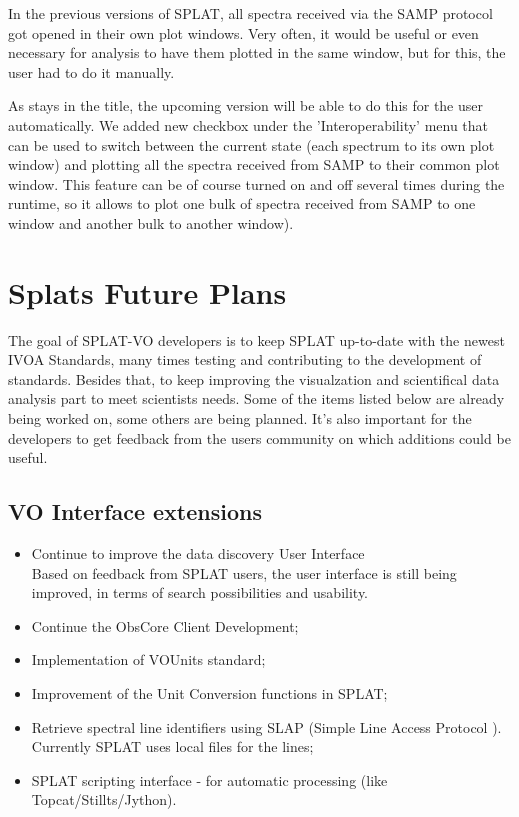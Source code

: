 \documentclass[final,authoryear,5p,times,twocolumn]{elsarticle}
\begin{document}
In the previous versions of SPLAT, all spectra received via the SAMP
protocol got opened in their own plot windows. Very often, it would be
useful or even necessary for analysis to have them plotted in the same
window, but for this, the user had to do it manually.

As stays in the title, the upcoming version will be able to do this
for the user automatically. We added new checkbox under the
'Interoperability' menu that can be used to switch between the current
state (each spectrum to its own plot window) and plotting all the
spectra received from SAMP to their common plot window. This feature
can be of course turned on and off several times during the runtime,
so it allows to plot one bulk of spectra received from SAMP to one
window and another bulk to another window).

\section{Splats Future Plans}

The goal of SPLAT-VO developers is to keep SPLAT up-to-date with the
newest IVOA Standards, many times testing and contributing to the
development of standards. Besides that, to keep improving the
visualzation and scientifical data analysis part to meet scientists
needs.  Some of the items listed below are already being worked on,
some others are being planned. It's also important for the developers
to get feedback from the users community on which additions could be
useful.

\subsection{VO Interface extensions}
\begin{itemize}
\item Continue to improve the data discovery User Interface\\
Based on feedback from SPLAT users, the user interface is still being improved, in terms of search possibilities and usability.
\item Continue the ObsCore Client Development;
\item Implementation of  VOUnits \cite{vounits} standard;
\item	Improvement of the Unit Conversion functions in SPLAT;\\
\item Retrieve spectral line identifiers using SLAP (Simple Line Access Protocol \cite{slap}). Currently SPLAT uses local files for the lines;
\item  SPLAT scripting interface - for automatic processing (like Topcat/Stillts/Jython).
\end{itemize}
\end{document}
